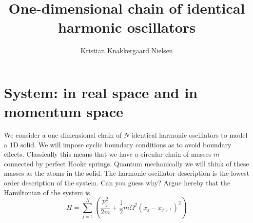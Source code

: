 \documentclass[10pt]{article}
\title{One-dimensional chain of identical harmonic oscillators}
\author{Kristian Knakkergaard Nielsen}
\begin{document}
\maketitle

\section{System: in real space and in momentum space}
We consider a one dimensional chain of $N$ identical harmonic oscillators to model a 1D solid. We will impose cyclic boundary conditions as to avoid boundary effects. Classically this means that we have a circular chain of masses $m$ connected by perfect Hooke springs. Quantum mechanically we will think of these masses as the atoms in the solid. The harmonic oscillator description is the lowest order description of the system. Can you guess why? Argue hereby that the Hamiltonian of the system is
\begin{equation}
H = \sum_{j=1}^N \left(\frac{p_j^2}{2m} + \frac{1}{2}m\Omega^2(x_j-x_{j+1})^2 \right)
\label{eq.hamiltonian_real_space}
\end{equation}
\end{document}
